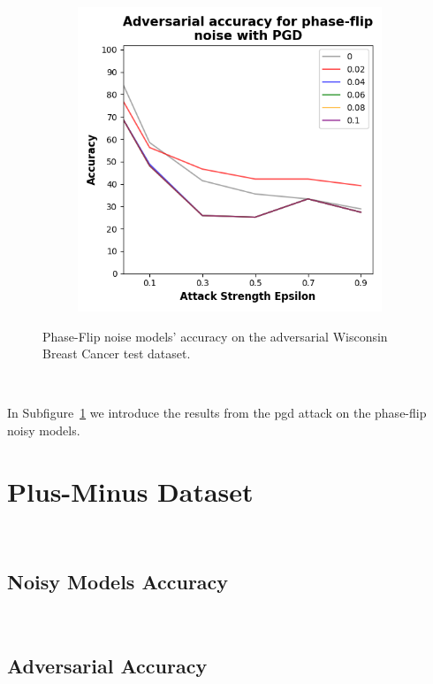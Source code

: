 \begin{figure}[!h]
\begin{subfigure}{0.45\textwidth}
      \includegraphics[width=\linewidth]{figures/evaluation_results/breast-cancer/pqc/figures/phase-flip-pgd.png}
      \label{fig:bc16}
  \end{subfigure}

  \caption{Phase-Flip noise models' accuracy on the adversarial Wisconsin Breast Cancer test dataset.}
  \label{fig:bc-1516}
\end{figure} \

In Subfigure~\ref{fig:bc16} we introduce the results from the \ac{pgd}
attack on the phase-flip noisy models. \

\section{Plus-Minus Dataset}\label{section:plus-minus-eval} \

\subsection{Noisy Models Accuracy}\label{subsection:plus-minus-noisy-acc} \

\subsection{Adversarial Accuracy}\label{subsection:plus-minus-adv-acc} \

